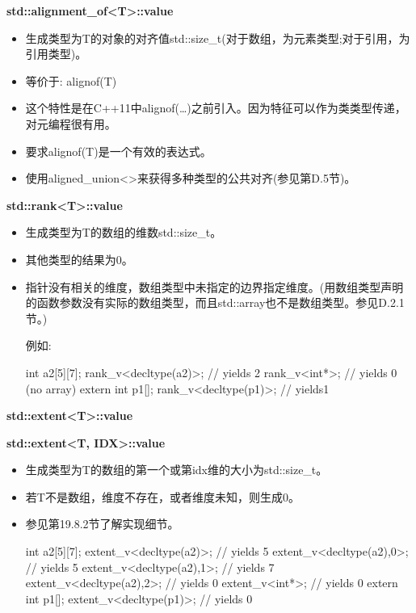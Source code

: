 \textbf{std::alignment\_of<T>::value}

\begin{itemize}
\item 
生成类型为T的对象的对齐值std::size\_t(对于数组，为元素类型;对于引用，为引用类型)。

\item 
等价于: alignof(T)

\item 
这个特性是在C++11中alignof(…)之前引入。因为特征可以作为类类型传递，对元编程很有用。

\item 
要求alignof(T)是一个有效的表达式。

\item 
使用aligned\_union<>来获得多种类型的公共对齐(参见第D.5节)。
\end{itemize}

\textbf{std::rank<T>::value}

\begin{itemize}
\item 
生成类型为T的数组的维数std::size\_t。

\item 
其他类型的结果为0。

\item 
指针没有相关的维度，数组类型中未指定的边界指定维度。(用数组类型声明的函数参数没有实际的数组类型，而且std::array也不是数组类型。参见D.2.1节。)

例如:
\begin{cpp}
int a2[5][7];
rank_v<decltype(a2)>; // yields 2
rank_v<int*>; // yields 0 (no array)
extern int p1[];
rank_v<decltype(p1)>; // yields1
\end{cpp}
\end{itemize}

\textbf{std::extent<T>::value}

\textbf{std::extent<T, IDX>::value}

\begin{itemize}
\item 
生成类型为T的数组的第一个或第idx维的大小为std::size\_t。

\item 
若T不是数组，维度不存在，或者维度未知，则生成0。

\item 
参见第19.8.2节了解实现细节。

\begin{cpp}
int a2[5][7];
extent_v<decltype(a2)>; // yields 5
extent_v<decltype(a2),0>; // yields 5
extent_v<decltype(a2),1>; // yields 7
extent_v<decltype(a2),2>; // yields 0
extent_v<int*>; // yields 0
extern int p1[];
extent_v<decltype(p1)>; // yields 0
\end{cpp}
\end{itemize}

